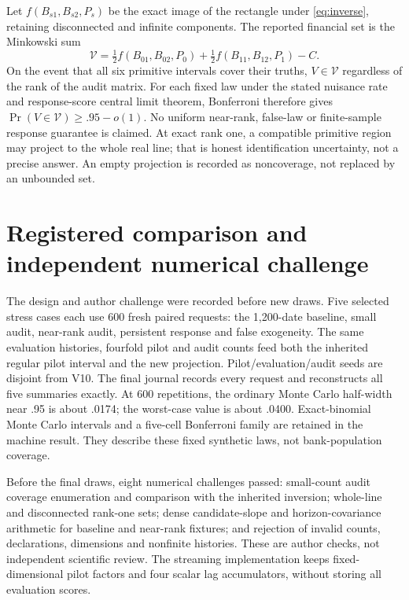 \documentclass[11pt,a4paper]{article}
\begin{document}
Let $f(B_{s1},B_{s2},P_s)$ be the exact image of the rectangle under
\eqref{eq:inverse}, retaining disconnected and infinite components. The
reported financial set is the Minkowski sum
\begin{equation}\label{eq:set}
 \mathcal V=\tfrac12 f(B_{01},B_{02},P_0)
 +\tfrac12 f(B_{11},B_{12},P_1)-C.
\end{equation}
On the event that all six primitive intervals cover their truths, $V\in
\mathcal V$ regardless of the rank of the audit matrix. For each fixed law
under the stated nuisance rate and response-score central limit theorem,
Bonferroni therefore gives $\Pr(V\in\mathcal V)\geq .95-o(1)$.
No uniform near-rank, false-law or finite-sample response guarantee is
claimed. At exact rank one, a compatible primitive region may project to the
whole real line; that is honest identification uncertainty, not a precise
answer. An empty projection is recorded as noncoverage, not replaced by an
unbounded set.

\section{Registered comparison and independent numerical challenge}

The design and author challenge were recorded before new draws. Five selected
stress cases each use 600 fresh paired requests: the 1,200-date baseline,
small audit, near-rank audit, persistent response and false exogeneity. The
same evaluation histories, fourfold pilot and audit counts feed both the
inherited regular pilot interval and the new projection. Pilot/evaluation/audit
seeds are disjoint from V10. The final journal records every request and
reconstructs all five summaries exactly. At 600 repetitions, the ordinary
Monte Carlo half-width near .95 is about .0174; the worst-case value is about
.0400. Exact-binomial Monte Carlo intervals and a five-cell Bonferroni family
are retained in the machine result. They describe these fixed synthetic laws,
not bank-population coverage.

Before the final draws, eight numerical challenges passed: small-count audit
coverage enumeration and comparison with the inherited inversion; whole-line
and disconnected rank-one sets; dense candidate-slope and horizon-covariance
arithmetic for baseline and near-rank fixtures; and rejection of invalid
counts, declarations, dimensions and nonfinite histories. These are author
checks, not independent scientific review. The streaming implementation keeps
fixed-dimensional pilot factors and four scalar lag accumulators, without
storing all evaluation scores.
\end{document}
